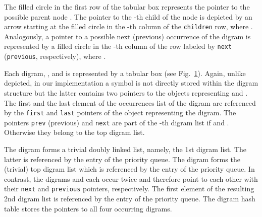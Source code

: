 \documentclass[12pt]{llncs}
\newcommand{\tp}{digram\xspace}
\newcommand{\tps}{digrams\xspace}
\begin{document}
\begin{example}
\begin{figure}[t]
{
		\label{fig:representationOfPair}
	}
	\hfill
\end{figure}
The filled circle in the first row of the tabular box represents the pointer to the possible parent node . The pointer to the -th child  of the node  is depicted by an arrow starting at the filled circle in the -th column of the \verb|children| row, where . Analogously, a pointer to a possible next (previous) occurrence of the \tp  is represented by a filled circle in the -th column of the row labeled by \verb|next| (\verb|previous|, respectively), where .
	
	Each \tp , ,  and  is represented by a tabular box (see Fig.~\ref{fig:representationOfPair}). Again, unlike depicted, in our implementation a symbol is not directly stored within the \tp structure but the latter contains two pointers to the objects representing  and .
	The first and the last element of the occurrences list of the \tp  are referenced by the \verb|first| and \verb|last| pointers of the object representing the \tp . The pointers \verb|prev| (previous) and \verb|next| are part of the -th \tp list if  and . Otherwise they belong to the top \tp list.
	
	The \tp  forms a trivial doubly linked list, namely, the 1st \tp list. The latter is referenced by the entry  of the priority queue. The \tp  forms the (trivial) top \tp list which is referenced by the entry  of the priority queue. In contrast, the \tps  and  each occur twice and therefore point to each other with their \texttt{next} and \texttt{previous} pointers, respectively. The first element of the resulting 2nd \tp list is referenced by the entry  of the priority queue. The \tp hash table stores the pointers to all four occurring \tps.
\end{example}
\end{document}
